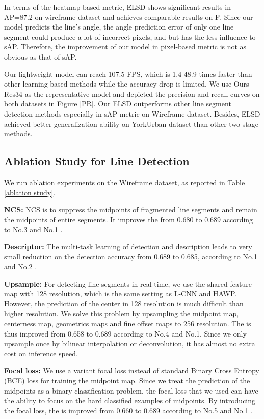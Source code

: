 \documentclass[10pt,twocolumn,letterpaper]{article}
\begin{document}
In terms of the heatmap based metric, ELSD shows significant results in AP=87.2 on wireframe dataset and  achieves comparable results on F. Since our model predicts the line's angle, the angle prediction error of only one line segment could produce a lot of incorrect pixels, and but has the less influence to sAP. Therefore, the improvement of our model in pixel-based metric is not as obvious as that of sAP.

Our lightweight model can reach 107.5 FPS, which is 1.4  48.9 times faster than other learning-based methods while the accuracy drop is limited. We use Ours-Res34 as the representative model and depicted the precision and recall curves on both datasets in Figure \ref{PR}. Our ELSD outperforms other line segment detection methods especially in sAP metric on Wireframe dataset. Besides, ELSD achieved better generalization ability on YorkUrban dataset than other two-stage methods.



\subsection{Ablation Study for Line Detection}\label{ablation_sec}
We run ablation experiments on the Wireframe dataset, as reported in Table \ref{ablation study}.

\textbf{NCS:} NCS is to suppress the midpoints of fragmented line segments and remain the midpoints of entire segments. It improves the  from 0.680 to 0.689 according to No.3 and No.1 . 

\textbf{Descriptor:} The multi-task learning of detection and description leads to very small reduction on the detection accuracy  from 0.689 to 0.685, according to No.1 and No.2 . 

\textbf{Upsample:} For detecting line segments in real time, we use the shared feature map with 128 resolution, which is the same setting as L-CNN and HAWP. However, the prediction of the center in 128 resolution is much difficult than higher resolution. We solve this problem by upsampling the midpoint map, centerness map, geometrics maps and fine offset maps to 256 resolution. The  is thus improved from 0.658 to 0.689 according to No.4 and No.1. Since we only upsample once by bilinear interpolation or deconvolution, it has almost no extra cost on inference speed.

\textbf{Focal loss:} We use a variant focal loss instead of standard Binary Cross Entropy (BCE) loss for training the midpoint map. Since we treat the prediction of the midpoints as a binary classification problem, the focal loss that we used can have the ability to focus on the hard classified examples of midpoints. By introducing the focal loss, the  is improved from 0.660 to 0.689 according to No.5 and No.1 . 
\end{document}
